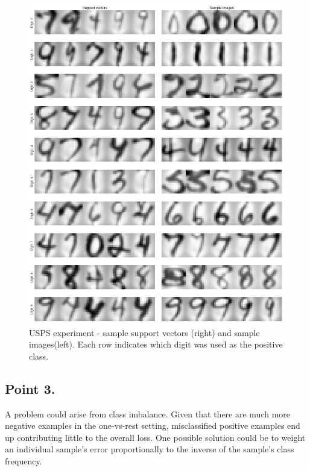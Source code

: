\documentclass[a4paper,11pt]{article}
\begin{document}
\begin{figure}
    \centering
    \includegraphics[width=\textwidth]{images/assignment7_2.png}
    \caption{USPS experiment - sample support vectors (right) and sample images(left). Each row indicates which digit was used as the positive class.}
    \label{fig:assignment7_2}
\end{figure}

\subsection*{Point 3.}

A problem could arise from class imbalance.
Given that there are much more negative examples in the one-vs-rest setting, misclassified positive examples end up contributing little to the overall loss.
One possible solution could be to weight an individual sample's error proportionally to the inverse of the sample's class frequency.
\end{document}
